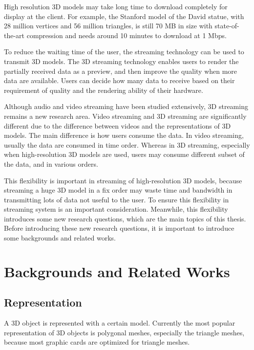 \documentclass[11pt, a4paper]{report}
\begin{document}
    High resolution 3D models may take long time to download completely
    for display at the client. 
    For example, the Stanford model of the David statue, with 28 million vertices and
    56 million triangles, is still 70 MB in size with
    state-of-the-art compression \cite{alliez2001progressive} and needs around 10 minutes
    to download at 1 Mbps.
    
    To reduce the waiting time of the user, 
    the streaming technology can be used to transmit 3D models. 
    The 3D streaming technology enables users to render the partially received data as a preview, 
    and then improve the quality when more data are available. 
    Users can decide how many data to receive based on their requirement of quality
    and the rendering ability of their hardware. 

    Although audio and video streaming have been studied extensively, 
    3D streaming remains a new research area. 
    Video streaming and 3D streaming are significantly different
    due to the difference between videos and the representations of 3D models. 
    The main difference is how users consume the data.
    In video streaming, usually the data are consumed in time order. 
    Whereas in 3D streaming, especially when high-resolution 3D models are used,
    users may consume different subset of the data, and in various orders.
    
    This flexibility is important in streaming of high-resolution 3D models, 
    because streaming a huge 3D model in a fix order may waste time and bandwidth in 
    transmitting lots of data not useful to the user. 
    To ensure this flexibility in streaming system is an important consideration.
    Meanwhile, this flexibility introduces some new research questions, 
    which are the main topics of this thesis.
    Before introducing these new research questions,
    it is important to introduce some backgrounds and related works.
    \section{Backgrounds and Related Works}
    \subsection{Representation}
    \label{s:intro:representation}
    A 3D object is represented with a certain model.
    Currently the most popular representation of 3D objects is polygonal meshes, 
    especially the triangle meshes, because most graphic cards are optimized for triangle meshes. 
\end{document}
